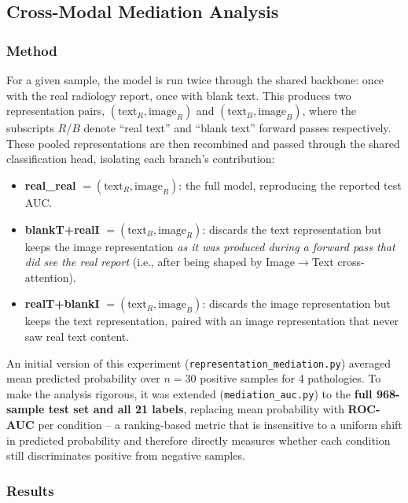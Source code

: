 \documentclass[11pt]{article}
\begin{document}
\subsection{Cross-Modal Mediation Analysis}

\subsubsection{Method}

For a given sample, the model is run twice through the shared backbone: once with
the real radiology report, once with blank text. This produces two representation
pairs, $(\text{text}_R, \text{image}_R)$ and $(\text{text}_B, \text{image}_B)$,
where the subscripts $R$/$B$ denote ``real text'' and ``blank text'' forward
passes respectively. These pooled representations are then recombined and passed
through the shared classification head, isolating each branch's contribution:

\begin{itemize}
  \item \textbf{real\_real} $= (\text{text}_R, \text{image}_R)$: the full model,
        reproducing the reported test AUC.
  \item \textbf{blankT+realI} $= (\text{text}_B, \text{image}_R)$: discards the
        text representation but keeps the image representation \emph{as it was
        produced during a forward pass that did see the real report} (i.e., after
        being shaped by Image$\to$Text cross-attention).
  \item \textbf{realT+blankI} $= (\text{text}_R, \text{image}_B)$: discards the
        image representation but keeps the text representation, paired with an
        image representation that never saw real text content.
\end{itemize}

An initial version of this experiment (\texttt{representation\_mediation.py})
averaged mean predicted probability over $n=30$ positive samples for 4
pathologies. To make the analysis rigorous, it was extended
(\texttt{mediation\_auc.py}) to the \textbf{full 968-sample test set and all 21
labels}, replacing mean probability with \textbf{ROC-AUC} per condition -- a
ranking-based metric that is insensitive to a uniform shift in predicted
probability and therefore directly measures whether each condition still
discriminates positive from negative samples.

\subsubsection{Results}
\end{document}
